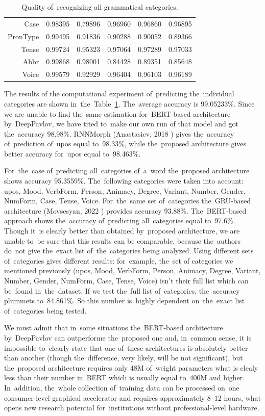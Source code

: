 \documentclass[11pt,twocolumn]{article}
\begin{document}
\begin{table}[tb]
\begin{tabular}{r|ccccc}
Case & 0.98395 & 0.79896 & 0.96960 & 0.96860 & 0.96895  \\
PronType & 0.99495 & 0.91836 & 0.90288 & 0.90052 & 0.89366  \\
Tense & 0.99724 & 0.95323 & 0.97064 & 0.97289 & 0.97033  \\
Abbr & 0.99868 & 0.98001 & 0.84428 & 0.89351 & 0.85648  \\
Voice & 0.99579 & 0.92929 & 0.96404 & 0.96103 & 0.96189  \\
      \end{tabular}
      \caption{Quality of~recognizing all grammatical categories.}
  \label{tab:categories}
\end{table}

The results of the computational experiment of~predicting the~individual categories are shown in~the~Table~\ref{tab:categories}.
The~average accuracy is 99.05233\%.
Since we are unable to find the~same estimation for~BERT-based architecture by~DeepPavlov, we have tried to~make our own run of that model and got the~accuracy 98.98\%.
RNNMorph (Anastasiev, 2018 \cite{lstm}) gives the~accuracy of~prediction  of~upos equal to~98.33\%,
while the~proposed architecture gives better accuracy for~upos equal to~98.463\%.

For~the~case of~predicting all~categories of~a~word the~proposed architecture shows accuracy 95.3559\%.
The~following categories were taken into account: upos, Mood, VerbForm, Person, Animacy, Degree, Variant, Number, Gender, NumForm, Case, Tense, Voice.
For~the~same set of~categories the~GRU-based architecture (Movsesyan, 2022 \cite{gru}) provides accuracy 93.88\%.
The~BERT-based approach shows the~accuracy of~predicting all~categories equal to~97.6\%.
Though it~is clearly better than obtained by~proposed architecture, we are unable to~be sure that this results can be comparable,
because the~authors do~not give the~exact list of~the~categories being analyzed.
Using different sets of~categories gives different results:
for~example, the~set of categories we mentioned previously (upos, Mood, VerbForm, Person, Animacy, Degree, Variant, Number, Gender, NumForm, Case, Tense, Voice) isn't their full list which can be~found in~the~dataset.
If we test the~full list of~categories, the~accuracy plummets to~84.861\%.
So this number is~highly dependent on~the~exact list of~categories being tested.

We must admit that in~some situations the~BERT-based architecture by~DeepPavlov can outperforme the~proposed one
and, in~common sense, it is impossible to~clearly state that one of~these architectures is absolutely better than another (though the~difference, very likely, will be not significant),
but the~proposed architecture requires only 48M of~weight parameters what is clealy less than their number in~BERT which is usually equal to~400M and higher.
In~addition, the~whole collection of~training data can be processed on~one consumer-level graphical accelerator and requires approximately 8--12 hours,
what opens new research potential for~institutions without professional-level hardware.
\end{document}
